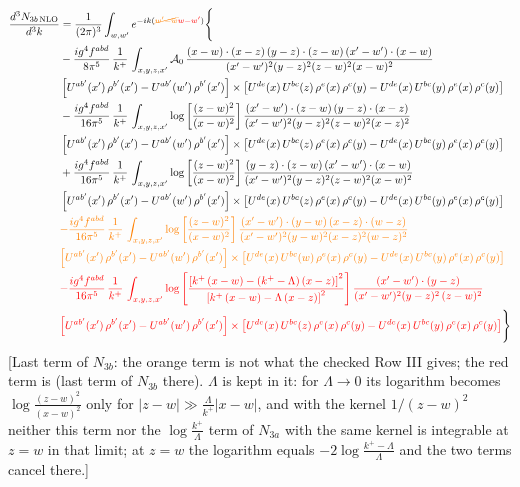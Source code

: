 \documentclass[9pt]{article}
\numberwithin{equation}{section}
\begin{document}
\begin{align}
\frac{d^{3}N_{3b\,\rm NLO}}{d^{3}k} & = \frac{1}{(2\pi)^{3}}\int_{w,w'}e^{-ik({\color{orange}\cancel{w'-w}}{\color{red}w-w'})}\Bigg\{\notag \\
&-\frac{ig^{4}f^{abd}}{8\pi^{5}}\,\frac{1}{k^{+}}\,\int_{x,y,z,x'}\mathcal{A}_{0}\,
\frac{(x-w)\cdot(x-z)\,(y-z)\cdot(z-w)\,(x'-w')\cdot(x-w)}{(x'-w')^{2}(y-z)^{2}(z-w)^{2}(x-w)^{2}}\notag \\ & \left[U^{ab'}(x')\,\rho^{b'}(x')-U^{ab'}(w')\, \rho^{b'}(x')\right]\times \left[U^{de}(x)\,U^{bc}(z)\, \rho^{e}(x)\,\rho^{c}(y)-U^{de}(x)\,U^{bc}(y)\,\rho^{e}(x)\,\rho^{c}(y)\right] \notag \\
& -\frac{ig^{4}f^{abd}}{16\pi^{5}}\,\frac{1}{k^{+}}\,\int_{x,y,z,x'}\log{\left[\frac{(z-w)^{2}}{(x-w)^{2}}\right]}\,
\frac{(x'-w')\cdot(z-w)\,(y-z)\cdot(x-z)}{(x'-w')^{2}(y-z)^{2}(z-w)^{2}(x-z)^{2}}\notag \\
&\left[U^{ab'}(x')\,\rho^{b'}(x')-U^{ab'}(w')\, \rho^{b'}(x')\right]\times \left[U^{de}(x)\,U^{bc}(z)\, \rho^{e}(x)\,\rho^{c}(y)-U^{de}(x)\,U^{bc}(y)\,\rho^{e}(x)\,\rho^{c}(y)\right] \notag \\
&+ \frac{ig^{4}f^{abd}}{16\pi^{5}}\,\frac{1}{k^{+}}\,\int_{x,y,z,x'}\log{\left[\frac{(z-w)^{2}}{(x-w)^{2}}\right]}\,
\frac{(y-z)\cdot(z-w)\,(x'-w')\cdot(x-w)}{(x'-w')^{2}(y-z)^{2}(z-w)^{2}(x-w)^{2}}\notag \\ 
& \left[U^{ab'}(x')\,\rho^{b'}(x')-U^{ab'}(w')\, \rho^{b'}(x')\right]\times \left[U^{de}(x)\,U^{bc}(z)\, \rho^{e}(x)\,\rho^{c}(y)-U^{de}(x)\,U^{bc}(y)\,\rho^{e}(x)\,\rho^{c}(y)\right]\notag \\ & {\color{orange}-\frac{ig^{4}f^{abd}}{16\pi^{5}}\,\frac{1}{k^{+}}\,\int_{x,y,z,x'}\log{\left[\frac{(z-w)^{2}}{(x-w)^{2}}\right]}\,\frac{(x'-w')\cdot(y-w)\, (x-z)\cdot (w-z)}{(x'-w')^{2}(y-w)^{2}(x-z)^{2}(w-z)^{2}}}\notag \\ & {\color{orange}\left[U^{ab'}(x')\,\rho^{b'}(x')-U^{ab'}(w')\, \rho^{b'}(x')\right]\times \left[U^{de}(x)\,U^{bc}(w)\, \rho^{e}(x)\,\rho^{c}(y)-U^{de}(x)\,U^{bc}(y)\,\rho^{e}(x)\,\rho^{c}(y)\right]}\notag \\ & {\color{red}-\frac{ig^{4}f^{abd}}{16\pi^{5}}\,\frac{1}{k^{+}}\,\int_{x,y,z,x'}\log{\left[\frac{\left[k^{+}\,(x-w)-(k^{+}-\Lambda)\,(x-z)\right]^{2}}{\left[k^{+}\,(x-w)-\Lambda\,(x-z)\right]^{2}}\right]}\,\frac{(x'-w')\cdot(y-z)}{(x'-w')^{2}(y-z)^{2}\,(z-w)^{2}}}\notag \\ & {\color{red}\left[U^{ab'}(x')\,\rho^{b'}(x')-U^{ab'}(w')\, \rho^{b'}(x')\right]\times \left[U^{de}(x)\,U^{bc}(z)\, \rho^{e}(x)\,\rho^{c}(y)-U^{de}(x)\,U^{bc}(y)\,\rho^{e}(x)\,\rho^{c}(y)\right]}\Bigg\}
\end{align} {\color{red}[Last term of $N_{3b}$: the orange term is not what the checked Row III gives; the red term is (last term of $N_{3b}$ there). $\Lambda$ is kept in it: for $\Lambda\to0$ its logarithm becomes $\log\frac{(z-w)^{2}}{(x-w)^{2}}$ only for $|z-w|\gg\frac{\Lambda}{k^{+}}|x-w|$, and with the kernel $1/(z-w)^{2}$ neither this term nor the $\log\frac{k^{+}}{\Lambda}$ term of $N_{3a}$ with the same kernel is integrable at $z=w$ in that limit; at $z=w$ the logarithm equals $-2\log\frac{k^{+}-\Lambda}{\Lambda}$ and the two terms cancel there.]}\par\noindent
\end{document}
